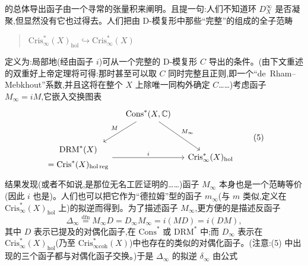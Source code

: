 的总体导出函子由一个寻常的张量积来阐明。且提一句:人们不知道环 $D^{\infty}_{X}$ 是否凝聚,但显然没有它也过得去。人们把由 D-模复形中那些“完整”的组成的全子范畴
\begin{quote}
$\mathrm{Cris}^{*}_{\infty}(X)_{\mathrm{hol}}\hookrightarrow \mathrm{Cris}^{*}_{\infty}(X)$
\end{quote}
定义为:局部地(经由函子 $i$)可从一个完整的 D-模复形 $C$ 导出的条件。(由下文重述的双重好上帝定理将可得:那时甚至可以取 $C$ 同时完整且正则,即一个“de~Rham--Mebkhout”系数,并且这将在整个 $X$ 上除唯一同构外确定 $C$……)考虑函子 $M_{\infty}=iM$,它嵌入交换图表
\begin{equation*}
\begin{tikzcd}[row sep=2.5em, column sep=1.2em]
& \mathrm{Cons}^{*}(X,\mathbb{C}) \arrow[dl,"M"'] \arrow[dr,"M_{\infty}"] & \\
\begin{gathered}\mathrm{DRM}^{*}(X)\\[3pt]={}\mathrm{Cris}^{*}(X)_{\mathrm{hol\,reg}}\end{gathered}
  \arrow[rr,"i"] & & \mathrm{Cris}^{*}_{\infty}(X)_{\mathrm{hol}}
\end{tikzcd}
\tag{5}
\end{equation*}
结果发现(或者不如说,是那位无名工匠证明的……)函子 $M_{\infty}$ 本身也是一个范畴等价(因此 $i$ 也是)。人们也可以把它作为“德拉姆”型的函子 $m_{\infty}$(与 $m$ 类似,定义在 $\mathrm{Cris}^{*}_{\infty}(X)_{\mathrm{hol}}$ 上)的拟逆而得到。为了描述函子 $M_{\infty}$,更方便的是描述反函子
\begin{equation*}
\Delta_{\infty}\overset{\mathrm{dfn}}{=}M_{\infty}D=D_{\infty}M_{\infty}=i(MD)=i(DM),
\tag{6}
\end{equation*}
其中 $D$ 表示已提及的对偶化函子,在 $\mathrm{Cons}^{*}$ 或 $\mathrm{DRM}^{*}$ 中;而 $D_{\infty}$ 表示在 $\mathrm{Cris}^{*}_{\infty}(X)_{\mathrm{hol}}$(乃至 $\mathrm{Cris}^{*}_{\infty\mathrm{coh}}(X)$)中也存在的类似的对偶化函子。(注意:(5) 中出现的三个函子都与对偶化函子交换。)于是 $\Delta_{\infty}$ 的拟逆 $\delta_{\infty}$ 由公式

